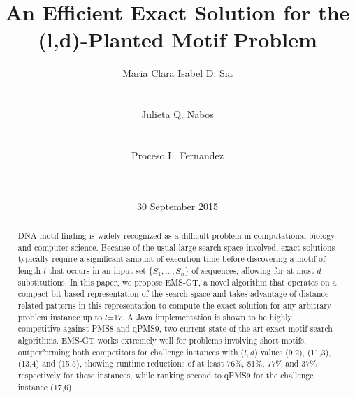 \documentclass{acm_proc_article-sp}
\begin{document}
\title{An Efficient Exact Solution for the (l,d)-Planted Motif Problem}
\author{
	\alignauthor
	Maria Clara Isabel D. Sia\\ %
		\\
	    \\
	\alignauthor
	Julieta Q. Nabos\\
		\\
		\\
	\alignauthor
	Proceso L. Fernandez\\
		\\
		\\
	}
\date{30 September 2015}
\maketitle

\begin{abstract}
	DNA motif finding is widely recognized as a difficult problem in computational biology and computer science. Because of the usual large search space involved, exact solutions typically require a significant amount of execution time before discovering a motif of length $l$ that occurs in an input set $\{S_{1} ,...,S_{n}\}$ of sequences, allowing for at most $d$ substitutions. In this paper, we propose EMS-GT, a novel algorithm that operates on a compact bit-based representation of the search space and takes advantage of distance-related patterns in this representation to compute the exact solution for any arbitrary problem instance up to $l$=17. A Java implementation
	is shown to be highly competitive against PMS8 and qPMS9, two current state-of-the-art exact motif search algorithms. EMS-GT works extremely well for problems involving short motifs, outperforming both competitors for challenge instances with ($l,d$) values (9,2), (11,3), (13,4) and (15,5), showing runtime reductions of at least 76\%, 81\%, 77\% and 37\% respectively for these instances, while ranking second to qPMS9 for the challenge instance (17,6).
\end{abstract}
\end{document}
